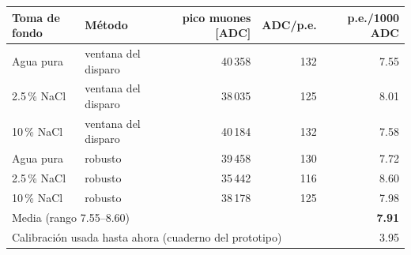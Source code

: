 \begin{tabular}{llrrr}
\toprule
Toma de fondo & Método & pico muones [ADC] & ADC/p.e. & p.e./1000 ADC \\
\midrule
Agua pura & ventana del disparo & 40\,358 & 132 & 7.55 \\
2.5\,\% NaCl & ventana del disparo & 38\,035 & 125 & 8.01 \\
10\,\% NaCl & ventana del disparo & 40\,184 & 132 & 7.58 \\
Agua pura & robusto & 39\,458 & 130 & 7.72 \\
2.5\,\% NaCl & robusto & 35\,442 & 116 & 8.60 \\
10\,\% NaCl & robusto & 38\,178 & 125 & 7.98 \\
\midrule
\multicolumn{4}{l}{Media (rango 7.55--8.60)} & \textbf{7.91} \\
\multicolumn{4}{l}{Calibración usada hasta ahora (cuaderno del prototipo)} & 3.95 \\
\bottomrule
\end{tabular}
